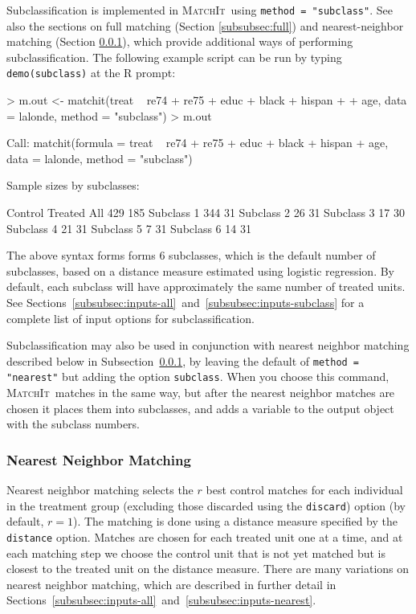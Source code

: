 \documentclass[oneside,letterpaper,titlepage]{article}
\newcommand{\MatchIt}{\textsc{MatchIt}}
\begin{document}
Subclassification is implemented in \MatchIt\ using \texttt{method =
  "subclass"}.  See also the sections on full matching (Section
\ref{subsubsec:full}) and nearest-neighbor matching (Section
\ref{subsubsec:nearest}), which provide additional ways of performing
subclassification.  The following example script can be run by typing
{\tt demo(subclass)} at the R prompt:
\begin{Schunk}
\begin{Sinput}
> m.out <- matchit(treat ~ re74 + re75 + educ + black + hispan + 
+     age, data = lalonde, method = "subclass")
> m.out
\end{Sinput}
\begin{Soutput}
Call: 
matchit(formula = treat ~ re74 + re75 + educ + black + hispan + 
    age, data = lalonde, method = "subclass")

Sample sizes by subclasses:

           Control Treated
All            429     185
Subclass 1     344      31
Subclass 2      26      31
Subclass 3      17      30
Subclass 4      21      31
Subclass 5       7      31
Subclass 6      14      31
\end{Soutput}
\end{Schunk}
The above syntax forms forms 6 subclasses, which is the default number
of subclasses, based on a distance measure estimated using logistic
regression.  By default, each subclass will have approximately the
same number of treated units.  See
Sections~\ref{subsubsec:inputs-all}~and~\ref{subsubsec:inputs-subclass}
for a complete list of input options for subclassification.

Subclassification may also be used in conjunction with nearest
neighbor matching described below in
Subsection~\ref{subsubsec:nearest}, by leaving the default of
\texttt{method = "nearest"} but adding the option \texttt{subclass}.
When you choose this command, \MatchIt\ matches in the same way, but
after the nearest neighbor matches are chosen it places them into
subclasses, and adds a variable to the output object with the subclass
numbers.

\subsubsection{Nearest Neighbor Matching}
\label{subsubsec:nearest}

Nearest neighbor matching selects the $r$ best control matches for
each individual in the treatment group (excluding those discarded
using the \texttt{discard}) option (by default, $r=1$).  The matching
is done using a distance measure specified by the {\tt distance}
option. Matches are chosen for each treated unit one at a time, and at
each matching step we choose the control unit that is not yet matched
but is closest to the treated unit on the distance measure.  There are
many variations on nearest neighbor matching, which are described in
further detail in
Sections~\ref{subsubsec:inputs-all}~and~\ref{subsubsec:inputs-nearest}.
\end{document}
